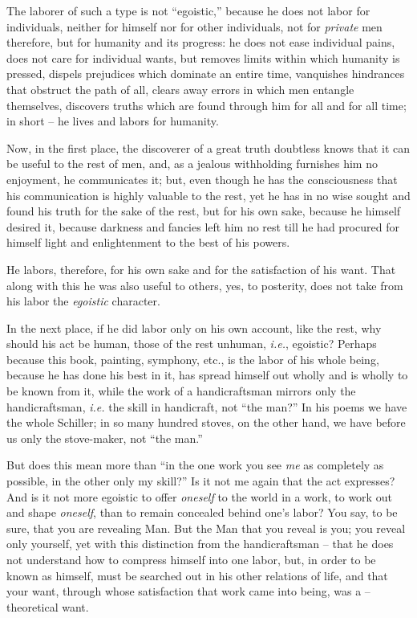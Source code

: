 The laborer of such a type is not ``egoistic,'' because he does not labor 
for individuals, neither for himself nor for other individuals, not for 
\textit{private} men therefore, but for humanity and its progress: he does not 
ease individual pains, does not care for individual wants, but removes limits 
within which humanity is pressed, dispels prejudices which dominate an entire 
time, vanquishes hindrances that obstruct the path of all, clears away errors 
in which men entangle themselves, discovers truths which are found through him 
for all and for all time; in short -- he lives and labors for humanity.

Now, in the first place, the discoverer of a great truth doubtless knows that 
it can be useful to the rest of men, and, as a jealous withholding furnishes 
him no enjoyment, he communicates it; but, even though he has the 
consciousness that his communication is highly valuable to the rest, yet he 
has in no wise sought and found his truth for the sake of the rest, but for 
his own sake, because he himself desired it, because darkness and fancies left 
him no rest till he had procured for himself light and enlightenment to the 
best of his powers.

He labors, therefore, for his own sake and for the satisfaction of his want. 
That along with this he was also useful to others, yes, to posterity, does not 
take from his labor the \textit{egoistic} character.

In the next place, if he did labor only on his own account, like the rest, why 
should his act be human, those of the rest unhuman, \textit{i.e.}, egoistic? 
Perhaps because this book, painting, symphony, etc., is the labor of his whole 
being, because he has done his best in it, has spread himself out wholly and 
is wholly to be known from it, while the work of a handicraftsman mirrors only 
the handicraftsman, \textit{i.e.} the skill in handicraft, not ``the man?'' 
In his poems we have the whole Schiller; in so many hundred stoves, on the 
other hand, we have before us only the stove-maker, not ``the man.''

But does this mean more than ``in the one work you see \textit{me} as 
completely as possible, in the other only my skill?'' Is it not me again that 
the act expresses? And is it not more egoistic to offer \textit{oneself} to 
the world in a work, to work out and shape \textit{oneself}, than to remain 
concealed behind one's labor? You say, to be sure, that you are revealing Man. 
But the Man that you reveal is you; you reveal only yourself, yet with this 
distinction from the handicraftsman -- that he does not understand how to 
compress himself into one labor, but, in order to be known as himself, must be 
searched out in his other relations of life, and that your want, through whose 
satisfaction that work came into being, was a -- theoretical want.

